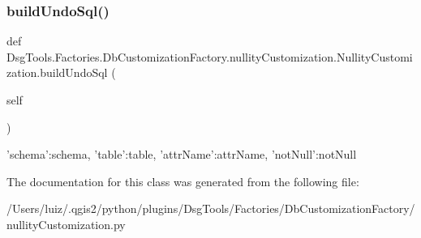 \subsubsection{\texorpdfstring{build\+Undo\+Sql()}{buildUndoSql()}}
{\footnotesize\ttfamily def Dsg\+Tools.\+Factories.\+Db\+Customization\+Factory.\+nullity\+Customization.\+Nullity\+Customization.\+build\+Undo\+Sql (\begin{DoxyParamCaption}\item[{}]{self }\end{DoxyParamCaption})}

\begin{DoxyVerb}{'schema':schema, 'table':table, 'attrName':attrName, 'notNull':notNull}
\end{DoxyVerb}
 

The documentation for this class was generated from the following file\+:\begin{DoxyCompactItemize}
\item 
/\+Users/luiz/.\+qgis2/python/plugins/\+Dsg\+Tools/\+Factories/\+Db\+Customization\+Factory/nullity\+Customization.\+py\end{DoxyCompactItemize}
